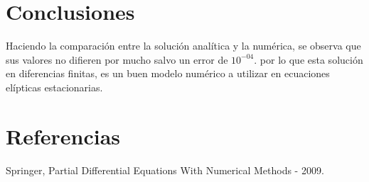 \documentclass[11pt,a4paper]{article}
\begin{document}
\newpage
\section{Conclusiones}
Haciendo la comparación entre la solución analítica y la numérica, se observa que sus valores no difieren por mucho salvo un error de $10^{-04}$. por lo que esta solución en diferencias finitas, es un buen modelo numérico a utilizar en ecuaciones elípticas estacionarias.
\section{Referencias}
Springer, Partial Differential Equations With Numerical Methods - 2009.
\end{document}

